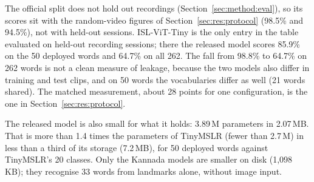 \documentclass[pdflatex,sn-mathphys-num,twocolumn]{sn-jnl}
\theoremstyle{thmstyleone}%
\begin{document}
The official split does not hold out recordings (Section~\ref{sec:method:eval}), so its scores sit with the random-video figures of Section~\ref{sec:res:protocol} (98.5\% and 94.5\%), not with held-out sessions. ISL-ViT-Tiny is the only entry in the table evaluated on held-out recording sessions; there the released model scores 85.9\% on the 50 deployed words and 64.7\% on all 262. The fall from 98.8\% to 64.7\% on 262 words is not a clean measure of leakage, because the two models also differ in training and test clips, and on 50 words the vocabularies differ as well (21 words shared). The matched measurement, about 28 points for one configuration, is the one in Section~\ref{sec:res:protocol}.

The released model is also small for what it holds: 3.89\,M parameters in 2.07\,MB. That is more than 1.4 times the parameters of TinyMSLR (fewer than 2.7\,M) in less than a third of its storage (7.2\,MB), for 50 deployed words against TinyMSLR's 20 classes. Only the Kannada models are smaller on disk (1,098\,KB); they recognise 33 words from landmarks alone, without image input.
\end{document}
